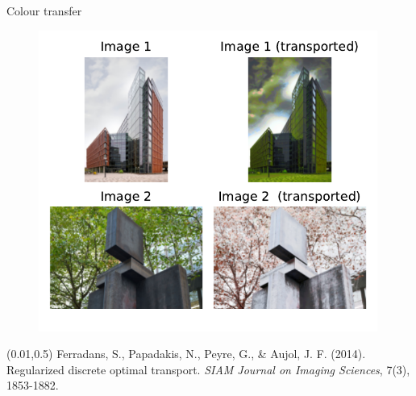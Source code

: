 \documentclass[pdf,aspectratio=169,10pt]{beamer}
\begin{document}
\begin{frame}[plain]{ Colour transfer}
\begin{minipage}{0.4\textwidth}
\end{minipage}
\hfill
\begin{minipage}{0.56\textwidth}
\qquad{}
    \begin{figure}
        \includegraphics[width=0.99\textwidth]{../img/ex1_result.pdf}
    \end{figure}
\end{minipage}

\begin{textblock}{0.45}(0.01,0.5)
\small
{}\vspace{0.3em}
\tiny{Ferradans, S., Papadakis, N., Peyre, G., \& Aujol, J. F. (2014). Regularized discrete optimal transport. \emph{SIAM Journal on Imaging Sciences}, 7(3), 1853-1882.}
\end{textblock}
\end{frame}
\end{document}
